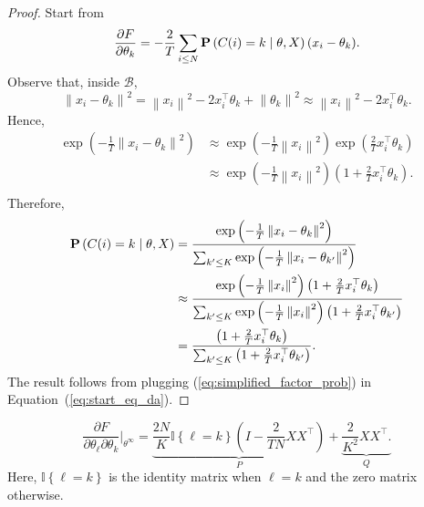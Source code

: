 \begin{proof}
Start from
%
\begin{equation}
\frac{\partial F}{\partial \theta_k} = - \frac{2}{T} \sum_{i \leq N} \mathbf{P}\left(C(i) = k \mid \theta, X\right)(x_i - \theta_k).
\label{eq:start_eq_da}
\end{equation}
%
Observe that, inside $\mathcal{B}$,
%
\begin{equation}
\left\|x_i - \theta_k\right\|^2 = \left\|x_i\right\|^2 - 2x_i^\top\theta_k + \left\|\theta_k\right\|^2 \approx \left\|x_i\right\|^2 - 2x_i^\top \theta_k.
\end{equation}
%
Hence,
%
\begin{align}
\exp\left(- \frac{1}{T}\left\|x_i - \theta_k\right\|^2\right) &\approx \exp\left(-\frac{1}{T}\left\|x_i\right\|^2\right)\exp\left(\frac{2}{T}x_i^\top \theta_k\right)\\
&\approx \exp\left(-\frac{1}{T}\left\|x_i\right\|^2\right)\left(1 + \frac{2}{T}x_i^\top \theta_k\right).\\
\end{align}
%
Therefore,
%
\begin{align}
\mathbf{P}\left(C(i) = k \mid \theta, X\right) &= \frac{\exp\left(-\frac{1}{T}\left\|x_i - \theta_k\right\|^2\right)}{\sum_{k' \leq K}\exp\left(-\frac{1}{T}\left\|x_i - \theta_{k'}\right\|^2\right)}\\
&\approx \frac{\exp\left(-\frac{1}{T}\left\|x_i\right\|^2\right)\left(1 + \frac{2}{T}x_i^\top \theta_k\right)}{\sum_{k' \leq K}\exp\left(-\frac{1}{T}\left\|x_i\right\|^2\right)\left(1 + \frac{2}{T}x_i^\top \theta_{k'}\right)}\\
&= \frac{\left(1 + \frac{2}{T}x_i^\top \theta_{k}\right)}{\sum_{k' \leq K}\left(1 + \frac{2}{T}x_i^\top \theta_{k'}\right)}.\label{eq:simplified_factor_prob}
\end{align}
%
The result follows from plugging (\ref{eq:simplified_factor_prob}) in Equation~(\ref{eq:start_eq_da}).
\end{proof}

\begin{lemma}
\begin{equation}
\frac{\partial F}{\partial \theta_\ell \partial \theta_k}\Bigr|_{\theta^\infty} = \underbrace{\frac{2N}{K}\mathbb{I}\left\{\ell = k\right\}\left(I - \frac{2}{TN}XX^\top\right)}_{P} + \underbrace{\frac{2}{K^2}XX^\top.}_Q
\end{equation}
Here, $\mathbb{I}\left\{\ell = k\right\}$ is the identity matrix when $\ell = k$ and the zero matrix otherwise.
\end{lemma}

